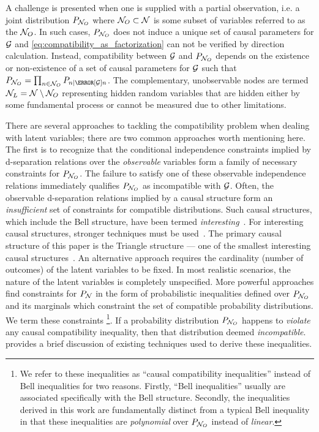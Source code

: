 \documentclass[aps, 10pt, english, twoside, pra, nofootinbib, tightenlines, longbibliography, superscriptaddress]{revtex4-1}
\begin{document}
    A challenge is presented when one is supplied with a partial observation, i.e. a joint distribution $\prob[\nodes_{O}]$ where $\mathcal{N}_{O} \subset \mathcal{N}$ is some subset of variables referred to as the  $\mathcal{N}_O$. In such cases, $\prob[\nodes_{O}]$ does not induce a unique set of causal parameters for $\mathcal{G}$ and \cref{eq:compatibility_as_factorization} can not be verified by direction calculation. Instead, compatibility between $\mathcal{G}$ and $\prob[\nodes_{O}]$ depends on the existence or non-existence of a set of causal parameters for $\mathcal{G}$ such that $\prob[\nodes_{O}] = \prod_{n \in \nodes_{O}} \prob[n \mid \Pa[\graph]{n}]$. The complementary, unobservable nodes are termed  $\mathcal{N}_L = \mathcal{N} \setminus \mathcal{N}_{O}$ representing hidden random variables that are hidden either by some fundamental process or cannot be measured due to other limitations.

    There are several approaches to tackling the compatibility problem when dealing with latent variables; there are two common approaches worth mentioning here. The first is to recognize that the conditional independence constraints implied by d-separation relations over the \textit{observable} variables form a family of necessary constraints for $\prob[\nodes_{O}]$. The failure to satisfy one of these observable independence relations immediately qualifies $\prob[\nodes_{O}]$ as incompatible with $\mathcal{G}$. Often, the observable d-separation relations implied by a causal structure form an \textit{insufficient} set of constraints for compatible distributions. Such causal structures, which include the Bell structure, have been termed \textit{interesting}~\cite{Henson_2014}. For interesting causal structures, stronger techniques must be used~\cite{Inflation}. The primary causal structure of this paper is the Triangle structure --- one of the smallest interesting causal structures~\cite{Henson_2014}. An alternative approach requires the cardinality (number of outcomes) of the latent variables to be fixed. In most realistic scenarios, the nature of the latent variables is completely unspecified. More powerful approaches find constraints for $\prob[\nodes]$ in the form of probabilistic inequalities defined over $\prob[\nodes_{O}]$ and its marginals which constraint the set of compatible probability distributions. We term these constraints \footnote{We refer to these inequalities as ``causal compatibility inequalities'' instead of Bell inequalities for two reasons. Firstly, ``Bell inequalities'' usually are associated specifically with the Bell structure. Secondly, the inequalities derived in this work are fundamentally distinct from a typical Bell inequality in that these inequalities are \textit{polynomial} over $\prob[\nodes_{O}]$ instead of \textit{linear}.}. If a probability distribution $\prob[\nodes_{O}]$ happens to \textit{violate} any causal compatibility inequality, then that distribution deemed \textit{incompatible}.  provides a brief discussion of existing techniques used to derive these inequalities.
\end{document}
